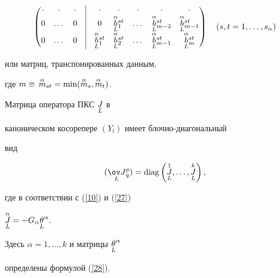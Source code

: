 \begin{thm}
\begin{equation}
\begin{pmatrix}
%


\cdot & \cdot & \cdot &


\vline & \cdot & \cdot & \cdot & \cdot & \cdot \\


%


0 & \dotsc & 0 &


\vline & 0 & \up{\alpha}{\down{L}{b}}{}^{st}_1 & \dotsc &


\up{\alpha}{\down{L}{b}}{}^{st}_{m-2} &


\up{\alpha}{\down{L}{b}}{}^{st}_{m-1} \\


%


0 & \dotsc & 0 & \vline


& \up{\alpha}{\down{L}{b}}{}^{st}_1 &


\up{\alpha}{\down{L}{b}}{}^{st}_2 & \dotsc &


\up{\alpha}{\down{L}{b}}{}^{st}_{m-1} &


\up{\alpha}{\down{L}{b}}{}^{st}_m


\end{pmatrix}\quad


(s,t=1,\dotsc ,s_{\alpha})


\end{equation}


или матриц, транспонированных данным,


где $m\equiv\, \up{\alpha}{m}_{st}=


\min(\up{\alpha}{m}_s,\up{\alpha}{m}_t)$.


\end{thm}





\begin{cor}


Матрица оператора ПКС $\underset{L}{J}$ в


каноническом косорепере $(Y_l)$ имеет блочно-диагональный


вид


\begin{equation} \label{31}


(\down{L}{\ov J}{}_q^p)=\diag\left(


\up{1}{\down{L}{J}},\dotsc,\up{k}{\down{L}{J}}\right),


\end{equation}


где в соответствии с (\ref{10}) и (\ref{27})


$\overset{\alpha}{\underset{L}{J}}=-G_{\alpha}{\underset{L}{\theta}}^{\alpha}.$


Здесь $\alpha=1,\dotsc,k$ и матрицы ${\underset{L}{\theta}}^{\alpha}$


определены формулой (\ref{28}).


\end{cor}





